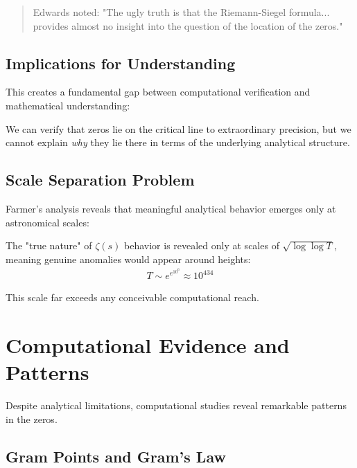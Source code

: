 \begin{quote}
Edwards noted: "The ugly truth is that the Riemann-Siegel formula... provides almost no insight into the question of the location of the zeros."
\end{quote}

\subsection{Implications for Understanding}

This creates a fundamental gap between computational verification and mathematical understanding:

\begin{remark}
We can verify that zeros lie on the critical line to extraordinary precision, but we cannot explain \textit{why} they lie there in terms of the underlying analytical structure.
\end{remark}

\subsection{Scale Separation Problem}

Farmer's analysis reveals that meaningful analytical behavior emerges only at astronomical scales:

\begin{theorem}
The "true nature" of $\zeta(s)$ behavior is revealed only at scales of $\sqrt{\log\log T}$, meaning genuine anomalies would appear around heights:
\begin{align}
T \sim e^{e^{10^6}} \approx 10^{434}
\end{align}
\end{theorem}

This scale far exceeds any conceivable computational reach.

\section{Computational Evidence and Patterns}
\label{sec:evidence-patterns}

Despite analytical limitations, computational studies reveal remarkable patterns in the zeros.

\subsection{Gram Points and Gram's Law}

